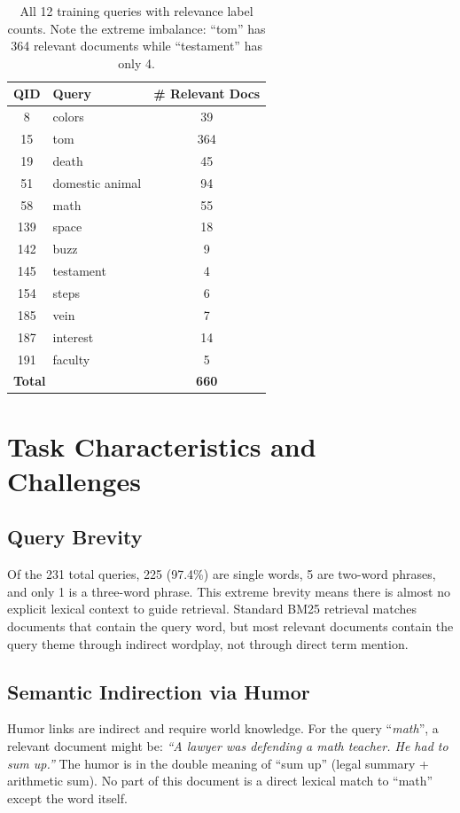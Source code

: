 \begin{table}[H]
\centering
\begin{tabular}{|c|l|c|}
\hline
\textbf{QID} & \textbf{Query} & \textbf{\# Relevant Docs} \\\hline
8   & colors          & 39  \\\hline
15  & tom             & 364 \\\hline
19  & death           & 45  \\\hline
51  & domestic animal & 94  \\\hline
58  & math            & 55  \\\hline
139 & space           & 18  \\\hline
142 & buzz            & 9   \\\hline
145 & testament       & 4   \\\hline
154 & steps           & 6   \\\hline
185 & vein            & 7   \\\hline
187 & interest        & 14  \\\hline
191 & faculty         & 5   \\\hline
\hline
\multicolumn{2}{|l|}{\textbf{Total}} & \textbf{660} \\\hline
\end{tabular}
\caption{All 12 training queries with relevance label counts. Note the extreme imbalance: ``tom'' has 364 relevant documents while ``testament'' has only 4.}
\label{tab:trainqueries}
\end{table}

\section{Task Characteristics and Challenges}

\subsection{Query Brevity}
Of the 231 total queries, 225 (97.4\%) are single words, 5 are two-word phrases, and only 1 is a three-word phrase. This extreme brevity means there is almost no explicit lexical context to guide retrieval. Standard BM25 retrieval matches documents that contain the query word, but most relevant documents contain the query theme through indirect wordplay, not through direct term mention.

\subsection{Semantic Indirection via Humor}
Humor links are indirect and require world knowledge. For the query ``\textit{math}'', a relevant document might be: \textit{``A lawyer was defending a math teacher. He had to sum up.''} The humor is in the double meaning of ``sum up'' (legal summary + arithmetic sum). No part of this document is a direct lexical match to ``math'' except the word itself.

